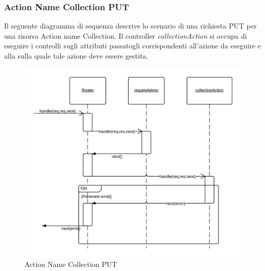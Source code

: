 \subsubsection{Action Name Collection PUT} 
Il seguente diagramma di sequenza descrive lo scenario di una richiesta PUT per una risorsa Action name Collection.
Il controller \emph{collectionAction} si occupa di eseguire i controlli sugli attributi passatogli corrispondenti all'azione da eseguire e alla  sulla quale tale azione deve essere gestita.
\begin{figure}[H]
	\begin{center} 
		\includegraphics[scale=0.20]{scenari/Action Name Collection PUT.png} 
		\caption{Action Name Collection PUT}
	\end{center} 
\end{figure}

